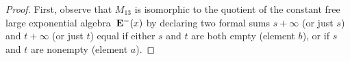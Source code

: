 \documentclass[eqnor,reqno]{amsart}
\theoremstyle{plain}
\newtheorem{lem}[thm]{Lemma}
\theoremstyle{definition}
\begin{document}
\begin{proof}
First, observe that $M_{13}$ is isomorphic to the quotient of the constant free large exponential algebra~${\bf E}^-(x)$ by declaring two formal sums $s+\infty$ (or just $s$) and $t+\infty$ (or just $t$) equal if either $s$ and $t$ are both empty (element $b$), or if $s$ and $t$ are nonempty (element $a$).


\end{proof}
\end{document}
